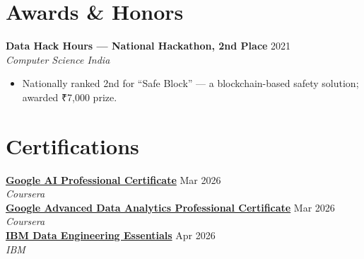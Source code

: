 \documentclass[10pt, letterpaper]{article}
\newcommand{\resumeEntry}[3]{%
  \vspace{4pt}%
  \textbf{#1} \hfill #3 \\
  \textit{\small #2}%
  \vspace{1pt}%
}
\begin{document}
\section{Awards \& Honors}

\resumeEntry{Data Hack Hours — National Hackathon, 2nd Place}{Computer Science India}{2021}
\begin{itemize}
  \item Nationally ranked 2nd for ``Safe Block'' — a blockchain-based safety solution; awarded ₹7,000 prize.
\end{itemize}

\section{Certifications}

\textbf{\href{https://www.credly.com/earner/earned/badge/098cfd98-fe08-4a87-8a30-cdb4810b7c91}{Google AI Professional Certificate}} \hfill Mar 2026 \\
\textit{Coursera}\\[4pt]

\textbf{\href{https://www.credly.com/earner/earned/badge/e3f50e0d-b330-4348-86e8-d96597a54942}{Google Advanced Data Analytics Professional Certificate}} \hfill Mar 2026 \\
\textit{Coursera}\\[4pt]

\textbf{\href{https://www.credly.com/badges/05f8d11e-1575-4122-a755-877c72bd70e0/public_url}{IBM Data Engineering Essentials}} \hfill Apr 2026 \\
\textit{IBM}

\end{document}
